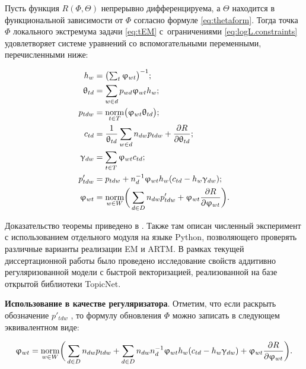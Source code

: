 \begin{Theorem}
\label{th:TARTM}
    Пусть функция $R(\Phi,\Theta)$ непрерывно дифференцируема, а $\Theta$ находится в функциональной зависимости от $\Phi$ согласно формуле \ref{eq:thetaform}.
    Тогда точка $\Phi$ локального экстремума задачи
    \eqref{eq:tEM} с~ограничениями \eqref{eq:logL.constraints}
    удовлетворяет системе уравнений со вспомогательными переменными, перечисленными ниже:

\begin{align*}
    h_w         &= \bigl( \textstyle\sum_t \upvarphi_{wt} \bigr)^{-1}; \\
    \uptheta_{td} &= \sum_{w\in d} p_{wd} \upvarphi_{wt} h_w; \\
    p_{tdw}     &= \mathop{\mathrm{norm}}\limits_{t\in T} \bigl(\upvarphi_{wt}\uptheta_{td} \bigr); \\
    c_{td}      &= \frac1{\uptheta_{td}}\sum_{w\in d} n_{dw}p_{tdw} + \frac{\partial R}{\partial \uptheta_{td}}; \\
    \upgamma_{dw} &= \sum_{t\in T} \upvarphi_{wt} c_{td}; \\
    p'_{tdw}    &= p_{tdw} + n_d^{-1} \upvarphi_{wt}h_w (c_{td}-h_w\upgamma_{dw});
\\
    \upvarphi_{wt} &= \mathop{\mathrm{norm}}\limits_{w\in W}
        \biggl(\,
        \sum_{d\in D} n_{dw} p'_{tdw}
        + \upvarphi_{wt} \frac{\partial{R}}{\partial{\ensuremath{\upvarphi}_{wt}}}
        \biggr).
\end{align*}
\end{Theorem}

Доказательство теоремы приведено в \cite{thetaless}. Также там описан численный эксперимент с использованием отдельного модуля на языке Python, позволяющего проверять различные варианты реализации EM и ARTM. В рамках текущей диссертационной работы было проведено исследование свойств аддитивно регуляризованной модели с быстрой векторизацией, реализованной на базе открытой библиотеки TopicNet.

\textbf{Использование в качестве регуляризатора}. Отметим, что если раскрыть обозначение $p'_{tdw}$ , то формулу обновления $\Phi$ можно записать в следующем эквивалентном виде:

\begin{equation} \label{eq:Mstep_noTheta}   
    \upvarphi_{wt} = \mathop{\mathrm{norm}}\limits_{w\in W}
        \biggl(\,
        \sum_{d\in D} n_{dw} p_{tdw}
        + \sum_{d\in D} n_{dw} n_d^{-1} \upvarphi_{wt}h_w (c_{td}-h_w\upgamma_{dw})
        + \upvarphi_{wt} \frac{\partial{R}}{\partial{\ensuremath{\upvarphi}_{wt}}}
        \biggr).
\end{equation}

